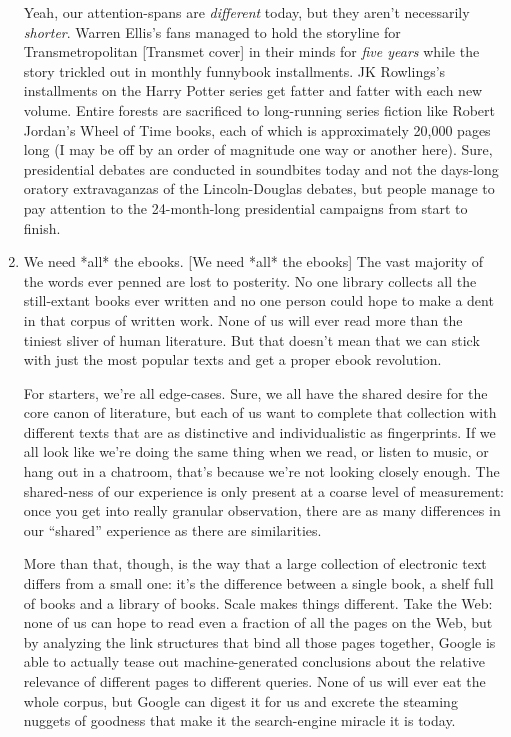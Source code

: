 \begin{enumerate}
  Yeah, our attention-spans are \emph{different} today, but they
  aren't necessarily \emph{shorter}. Warren Ellis's fans managed to
  hold the storyline for Transmetropolitan [Transmet cover] in their
  minds for \emph{five years} while the story trickled out in
  monthly funnybook installments. JK Rowlings's installments on the
  Harry Potter series get fatter and fatter with each new volume.
  Entire forests are sacrificed to long-running series fiction like
  Robert Jordan's Wheel of Time books, each of which is approximately
  20,000 pages long (I may be off by an order of magnitude one way or
  another here). Sure, presidential debates are conducted in
  soundbites today and not the days-long oratory extravaganzas of the
  Lincoln-Douglas debates, but people manage to pay attention to the
  24-month-long presidential campaigns from start to finish.
  
\item
  We need *all* the ebooks. [We need *all* the ebooks] The vast
  majority of the words ever penned are lost to posterity. No one
  library collects all the still-extant books ever written and no one
  person could hope to make a dent in that corpus of written work.
  None of us will ever read more than the tiniest sliver of human
  literature. But that doesn't mean that we can stick with just the
  most popular texts and get a proper ebook revolution.

  For starters, we're all edge-cases. Sure, we all have the shared
  desire for the core canon of literature, but each of us want to
  complete that collection with different texts that are as
  distinctive and individualistic as fingerprints. If we all look
  like we're doing the same thing when we read, or listen to music,
  or hang out in a chatroom, that's because we're not looking closely
  enough. The shared-ness of our experience is only present at a
  coarse level of measurement: once you get into really granular
  observation, there are as many differences in our ``shared''
  experience as there are similarities.
  
  More than that, though, is the way that a large collection of
  electronic text differs from a small one: it's the difference
  between a single book, a shelf full of books and a library of
  books. Scale makes things different. Take the Web: none of us can
  hope to read even a fraction of all the pages on the Web, but by
  analyzing the link structures that bind all those pages together,
  Google is able to actually tease out machine-generated conclusions
  about the relative relevance of different pages to different
  queries. None of us will ever eat the whole corpus, but Google can
  digest it for us and excrete the steaming nuggets of goodness that
  make it the search-engine miracle it is today.
  

\end{enumerate}
